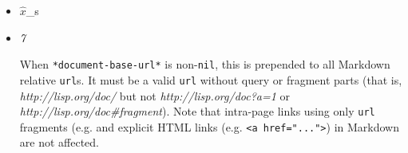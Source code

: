 \begin{itemize}
\item
  \label{x-28MGL-PAX-TEST-3AFN-WITH-MATHJAX-20FUNCTION-29}

  \(\hat{x}\)\_s
\item
  \label{x-28MGL-PAX-TEST-3A-2APDF-TEST-2A-20VARIABLE-29}
  \emph{7}

  When \texttt{*document-base-url*} is non-\texttt{nil}, this is
  prepended to all Markdown relative \texttt{url}s. It must be a valid
  \texttt{url} without query or fragment parts (that is,
  \emph{http://lisp.org/doc/} but not \emph{http://lisp.org/doc?a=1} or
  \emph{http://lisp.org/doc\#fragment}). Note that intra-page links
  using only \texttt{url} fragments (e.g. and explicit HTML links (e.g.
  \texttt{\textless{}a\ href="..."\textgreater{}}) in Markdown are not
  affected.
\end{itemize}

